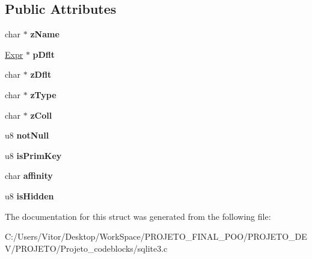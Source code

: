 \subsection*{Public Attributes}
\begin{DoxyCompactItemize}
\item 
\hypertarget{struct_column_a6450a4e9fde68b3a2d79425d826eccc3}{char $\ast$ {\bfseries z\-Name}}\label{struct_column_a6450a4e9fde68b3a2d79425d826eccc3}

\item 
\hypertarget{struct_column_ac4178f302df70048235660979f84ffe4}{\hyperlink{struct_expr}{Expr} $\ast$ {\bfseries p\-Dflt}}\label{struct_column_ac4178f302df70048235660979f84ffe4}

\item 
\hypertarget{struct_column_a88d29c685783cddfbd039e5674990f4b}{char $\ast$ {\bfseries z\-Dflt}}\label{struct_column_a88d29c685783cddfbd039e5674990f4b}

\item 
\hypertarget{struct_column_aef09f43479c4bd2d07f77d340020f95f}{char $\ast$ {\bfseries z\-Type}}\label{struct_column_aef09f43479c4bd2d07f77d340020f95f}

\item 
\hypertarget{struct_column_aa95909d5c77b321258622ed28d7b96eb}{char $\ast$ {\bfseries z\-Coll}}\label{struct_column_aa95909d5c77b321258622ed28d7b96eb}

\item 
\hypertarget{struct_column_a852e9a4c1c327a64d9b051dcafda3841}{u8 {\bfseries not\-Null}}\label{struct_column_a852e9a4c1c327a64d9b051dcafda3841}

\item 
\hypertarget{struct_column_a57a53c2c60925a1ce5fdfe8fa3ccd62a}{u8 {\bfseries is\-Prim\-Key}}\label{struct_column_a57a53c2c60925a1ce5fdfe8fa3ccd62a}

\item 
\hypertarget{struct_column_ac9d6fe31c45888cecaf3f5ad5b93bf23}{char {\bfseries affinity}}\label{struct_column_ac9d6fe31c45888cecaf3f5ad5b93bf23}

\item 
\hypertarget{struct_column_aafdb39efd9b21476415c5beeb5a8b180}{u8 {\bfseries is\-Hidden}}\label{struct_column_aafdb39efd9b21476415c5beeb5a8b180}

\end{DoxyCompactItemize}


The documentation for this struct was generated from the following file\-:\begin{DoxyCompactItemize}
\item 
C\-:/\-Users/\-Vitor/\-Desktop/\-Work\-Space/\-P\-R\-O\-J\-E\-T\-O\-\_\-\-F\-I\-N\-A\-L\-\_\-\-P\-O\-O/\-P\-R\-O\-J\-E\-T\-O\-\_\-\-D\-E\-V/\-P\-R\-O\-J\-E\-T\-O/\-Projeto\-\_\-codeblocks/sqlite3.\-c\end{DoxyCompactItemize}
